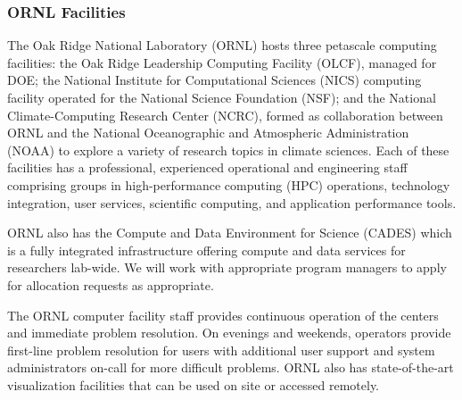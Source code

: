 \subsubsection{ORNL Facilities}
The Oak Ridge National Laboratory (ORNL) hosts three petascale computing 
facilities: the Oak Ridge Leadership Computing 
Facility (OLCF), managed for DOE; the National Institute for Computational 
Sciences (NICS) computing facility operated 
for the National Science Foundation (NSF); and the National Climate-Computing 
Research Center (NCRC), formed as 
collaboration between ORNL and the National Oceanographic and Atmospheric 
Administration (NOAA) to explore a variety of 
research topics in climate sciences. Each of these facilities has a 
professional, experienced operational and engineering 
staff comprising groups in high-performance computing (HPC) operations, 
technology integration, user services, scientific 
computing, and application performance tools.

ORNL also has the Compute and Data Environment for Science (CADES) which is a 
fully integrated infrastructure offering compute and data services for 
researchers lab-wide. We will work with appropriate program managers to apply 
for allocation requests as appropriate.


 The ORNL computer facility staff 
provides continuous operation of the centers 
and immediate problem resolution. On evenings and weekends, operators provide 
first-line problem resolution for users with 
additional user support and system administrators on-call for more difficult 
problems. ORNL also has state-of-the-art 
visualization facilities that can be used on site or accessed remotely. 
